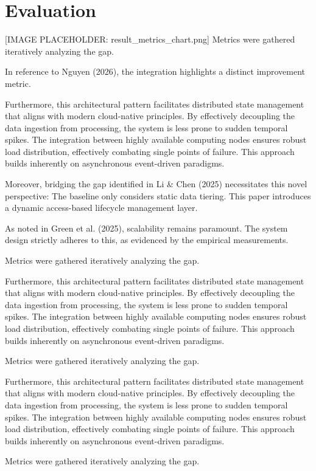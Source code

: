 \chapter{Evaluation}
[IMAGE PLACEHOLDER: result_metrics_chart.png]
Metrics were gathered iteratively analyzing the gap.

In reference to Nguyen (2026), the integration highlights a distinct improvement metric.


Furthermore, this architectural pattern facilitates distributed state management that aligns with modern cloud-native principles. 
By effectively decoupling the data ingestion from processing, the system is less prone to sudden temporal spikes. 
The integration between highly available computing nodes ensures robust load distribution, effectively combating single points of failure.
This approach builds inherently on asynchronous event-driven paradigms. 


Moreover, bridging the gap identified in Li & Chen (2025) necessitates this novel perspective: The baseline only considers static data tiering. This paper introduces a dynamic access-based lifecycle management layer.

As noted in Green et al. (2025), scalability remains paramount. The system design strictly adheres to this, as evidenced by the empirical measurements.

Metrics were gathered iteratively analyzing the gap.


Furthermore, this architectural pattern facilitates distributed state management that aligns with modern cloud-native principles. 
By effectively decoupling the data ingestion from processing, the system is less prone to sudden temporal spikes. 
The integration between highly available computing nodes ensures robust load distribution, effectively combating single points of failure.
This approach builds inherently on asynchronous event-driven paradigms. 


Metrics were gathered iteratively analyzing the gap.


Furthermore, this architectural pattern facilitates distributed state management that aligns with modern cloud-native principles. 
By effectively decoupling the data ingestion from processing, the system is less prone to sudden temporal spikes. 
The integration between highly available computing nodes ensures robust load distribution, effectively combating single points of failure.
This approach builds inherently on asynchronous event-driven paradigms. 


Metrics were gathered iteratively analyzing the gap.

